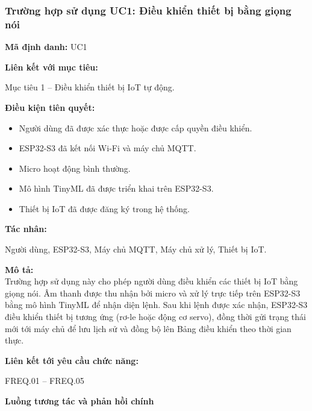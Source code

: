 \documentclass[a4paper,12pt]{article}
\begin{document}
\subsubsection{Trường hợp sử dụng UC1: Điều khiển thiết bị bằng giọng nói}

\textbf{Mã định danh:} UC1

\textbf{Liên kết với mục tiêu:}

Mục tiêu 1 -- Điều khiển thiết bị IoT tự động.

\textbf{Điều kiện tiên quyết:}

\begin{itemize}
    \item Người dùng đã được xác thực hoặc được cấp quyền điều khiển.
    \item ESP32-S3 đã kết nối Wi-Fi và máy chủ MQTT.
    \item Micro hoạt động bình thường.
    \item Mô hình TinyML đã được triển khai trên ESP32-S3.
    \item Thiết bị IoT đã được đăng ký trong hệ thống.
\end{itemize}

\textbf{Tác nhân:}

Người dùng, ESP32-S3, Máy chủ MQTT, Máy chủ xử lý, Thiết bị IoT.

\textbf{Mô tả:} \\

Trường hợp sử dụng này cho phép người dùng điều khiển các thiết bị IoT bằng giọng nói. Âm thanh được thu nhận bởi micro và xử lý trực tiếp trên ESP32-S3 bằng mô hình TinyML để nhận diện lệnh. Sau khi lệnh được xác nhận, ESP32-S3 điều khiển thiết bị tương ứng (rơ-le hoặc động cơ servo), đồng thời gửi trạng thái mới tới máy chủ để lưu lịch sử và đồng bộ lên Bảng điều khiển theo thời gian thực.

\textbf{Liên kết tới yêu cầu chức năng:}

FREQ.01 -- FREQ.05

\vspace{0.3cm}

\textbf{Luồng tương tác và phản hồi chính}
\end{document}
